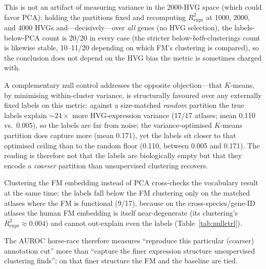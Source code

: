 \documentclass[fleqn,10pt,lineno]{wlpeerj}  %
\begin{document}
This is not an artifact of measuring variance in the 2000-HVG space (which could favor PCA): holding the partitions fixed and recomputing $R^2_{\mathrm{expr}}$ at 1000, 2000, and 4000 HVGs and---decisively---over \emph{all} genes (no HVG selection), the labels-below-PCA count is 20/20 in every case (the stricter below-\emph{both}-clusterings count is likewise stable, 10--11/20 depending on which FM's clustering is compared), so the conclusion does not depend on the HVG bias the metric is sometimes charged with.

A complementary null control addresses the opposite objection---that $K$-means, by minimising within-cluster variance, is structurally favoured over any externally fixed labels on this metric: against a size-matched \emph{random} partition the true labels explain ${\sim}24\times$ more HVG-expression variance (17/17 atlases; mean 0.110 vs.\ 0.005), so the labels are far from noise; the variance-optimised $K$-means partition does capture more (mean 0.171), yet the labels sit closer to that optimised ceiling than to the random floor (0.110, between 0.005 and 0.171). The reading is therefore not that the labels are biologically empty but that they encode a \emph{coarser} partition than unsupervised clustering recovers.

Clustering the FM embedding instead of PCA cross-checks the vocabulary result at the same time: the labels fall below the FM clustering only on the matched atlases where the FM is functional (9/17), because on the cross-species/gene-ID atlases the human FM embedding is itself near-degenerate (its clustering's $R^2_{\mathrm{expr}}\!\approx\!0.004$) and cannot out-explain even the labels (Table~\ref{tab:nullctrl}).

The AUROC horse-race therefore measures ``reproduce this particular (coarser) annotation cut'' more than ``capture the finer expression structure unsupervised clustering finds''; on that finer structure the FM and the baseline are tied.
\end{document}
